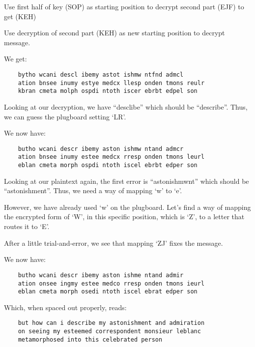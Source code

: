 \begin{Answer}
  Use first half of key (SOP) as starting position to decrypt second part (EJF) to get (KEH)

  \noindent
  Use decryption of second part (KEH) as new starting position to decrypt message.

  \noindent
  We get:

  \begin{Verbatim}
    bytho wcani descl ibemy astot ishmw ntfnd admcl
    ation bnsee inumy estye medcx llesp onden tmons reulr
    kbran cmeta molph ospdi ntoth iscer ebrbt edpel son
  \end{Verbatim}

  \noindent
  Looking at our decryption, we have ``desclibe'' which should be ``describe''. Thus, we can guess
  the plugboard setting `LR'.

  We now have:
  \begin{Verbatim}
    butho wcani descr ibemy aston ishmw ntand admcr
    ation bnsee inumy estee medcx rresp onden tmons leurl
    eblan cmeta morph ospdi ntoth iscel ebrbt edper son
  \end{Verbatim}

  \noindent
  Looking at our plaintext again, the first error is ``astonishmwnt'' which should be ``astonishment''.
  Thus, we need a way of mapping `w' to `e'.

  \noindent
  However, we have already used `w' on the plugboard. Let's find a way of mapping the encrypted form of `W',
  in this specific position, which is `Z', to a letter that routes it to `E'.

  \noindent
  After a little trial-and-error, we see that mapping `ZJ' fixes the message.

  We now have:
  \begin{Verbatim}
    butho wcani descr ibemy aston ishme ntand admir
    ation onsee ingmy estee medco rresp onden tmons ieurl
    eblan cmeta morph osedi ntoth iscel ebrat edper son
  \end{Verbatim}

  \noindent
  Which, when spaced out properly, reads:

  \color{crimson}
  \begin{Verbatim}
    but how can i describe my astonishment and admiration
    on seeing my esteemed correspondent monsieur leblanc
    metamorphosed into this celebrated person
  \end{Verbatim}
  \color{black}
\end{Answer}
